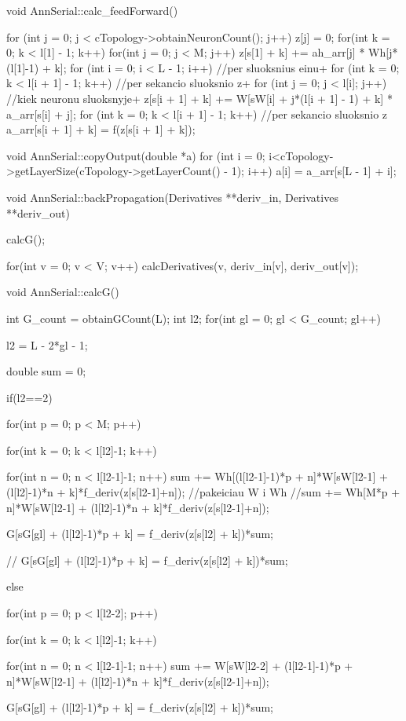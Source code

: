 void AnnSerial::calc\_feedForward(){

  for (int j = 0; j < cTopology->obtainNeuronCount(); j++) {
		z[j] = 0;
	}
  for(int k = 0; k < l[1] - 1; k++){
    for(int j = 0; j < M; j++){
      z[s[1] + k] += ah\_arr[j] * Wh[j*(l[1]-1) + k];
    }
  }
	for (int i = 0; i < L - 1; i++) {//per sluoksnius einu+
    for (int k = 0; k < l[i + 1] - 1; k++) {//per sekancio sluoksnio z+
		  for (int j = 0; j < l[i]; j++) { //kiek neuronu sluoksnyje+
				z[s[i + 1] + k] += W[sW[i] + j*(l[i + 1] - 1) + k] * a\_arr[s[i] + j];
			}
		}
		for (int k = 0; k < l[i + 1] - 1; k++) {//per sekancio sluoksnio z
			a\_arr[s[i + 1] + k] = f(z[s[i + 1] + k]);
		}
	}
}

void AnnSerial::copyOutput(double *a){
  for (int i = 0; i<cTopology->getLayerSize(cTopology->getLayerCount() - 1); i++)
		a[i] = a\_arr[s[L - 1] + i];
}

void AnnSerial::backPropagation(Derivatives **deriv\_in, Derivatives **deriv\_out){

  calcG();

  for(int v = 0; v < V; v++)
    calcDerivatives(v, deriv\_in[v],  deriv\_out[v]);
}

void AnnSerial::calcG(){
  int G\_count = obtainGCount(L);
  int l2;
  for(int gl = 0; gl < G\_count; gl++){
    l2 = L - 2*gl - 1;

    double sum = 0;

    if(l2==2){

      for(int p = 0; p < M; p++){
        for(int k = 0; k < l[l2]-1; k++){

          for(int n = 0; n < l[l2-1]-1; n++){
            sum += Wh[(l[l2-1]-1)*p + n]*W[sW[l2-1] + (l[l2]-1)*n + k]*f\_deriv(z[s[l2-1]+n]);
            //pakeiciau W i Wh
            //sum += Wh[M*p + n]*W[sW[l2-1] + (l[l2]-1)*n + k]*f\_deriv(z[s[l2-1]+n]);
          }

          G[sG[gl] + (l[l2]-1)*p + k] = f\_deriv(z[s[l2] + k])*sum;
        }

      //  G[sG[gl] + (l[l2]-1)*p + k] = f\_deriv(z[s[l2] + k])*sum;
      }

    }else{
      for(int p = 0; p < l[l2-2]; p++){
        for(int k = 0; k < l[l2]-1; k++){

          for(int n = 0; n < l[l2-1]-1; n++){
            sum += W[sW[l2-2] + (l[l2-1]-1)*p + n]*W[sW[l2-1] + (l[l2]-1)*n + k]*f\_deriv(z[s[l2-1]+n]);
          }

          G[sG[gl] + (l[l2]-1)*p + k] = f\_deriv(z[s[l2] + k])*sum;
        }
      }
    }
  }
}

